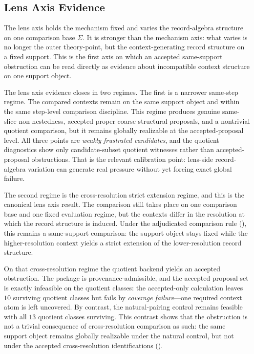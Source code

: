 \documentclass[11pt]{article}
\theoremstyle{definition}
\begin{document}
\subsection{Lens Axis Evidence}\label{sec:discovery-lens}

The lens axis holds the mechanism fixed and varies the record-algebra structure on one comparison base \(\Sigma\). It is stronger than the mechanism axis: what varies is no longer the outer theory-point, but the context-generating record structure on a fixed support. This is the first axis on which an accepted same-support obstruction can be read directly as evidence about incompatible context structure on one support object.

The lens axis evidence closes in two regimes. The first is a narrower same-step regime. The compared contexts remain on the same support object and within the same step-level comparison discipline. This regime produces genuine same-slice non-nestedness, accepted proper-coarse structural proposals, and a nontrivial quotient comparison, but it remains globally realizable at the accepted-proposal level. All three points are \emph{weakly frustrated candidates}, and the quotient diagnostics show only candidate-subset quotient witnesses rather than accepted-proposal obstructions. That is the relevant calibration point: lens-side record-algebra variation can generate real pressure without yet forcing exact global failure.

The second regime is the cross-resolution strict extension regime, and this is the canonical lens axis result. The comparison still takes place on one comparison base and one fixed evaluation regime, but the contexts differ in the resolution at which the record structure is induced. Under the adjudicated comparison rule (), this remains a same-support comparison: the support object stays fixed while the higher-resolution context yields a strict extension of the lower-resolution record structure.

On that cross-resolution regime the quotient backend yields an accepted obstruction. The package is provenance-admissible, and the accepted proposal set is exactly infeasible on the quotient classes: the accepted-only calculation leaves \(10\) surviving quotient classes but fails by \emph{coverage failure}---one required context atom is left uncovered. By contrast, the natural-pairing control remains feasible with all \(13\) quotient classes surviving. This contrast shows that the obstruction is not a trivial consequence of cross-resolution comparison as such: the same support object remains globally realizable under the natural control, but not under the accepted cross-resolution identifications ().
\end{document}
